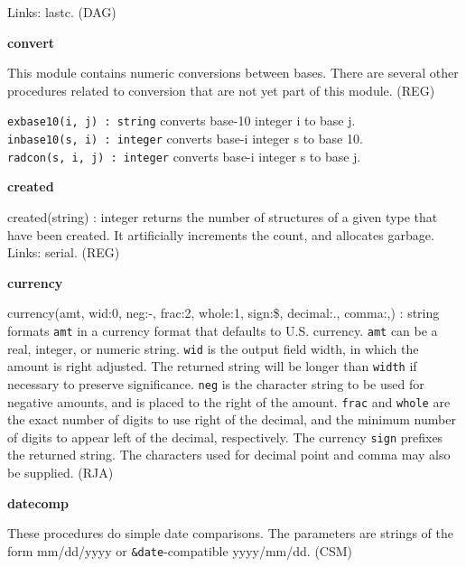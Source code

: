 
Links: lastc. (DAG)

{\sffamily\bfseries
convert}

This module contains numeric conversions between
bases. There are several other procedures related
to conversion that are not yet part of this module. (REG)

\texttt{exbase10(i, j) : string} converts base-10 integer i to base
j.\\
\texttt{inbase10(s, i) : integer} converts base-i integer s to base
10.\\
\texttt{radcon(s, i, j) : integer} converts base-i integer s to base j.

{\sffamily\bfseries
created}

\textsf{created(string) : integer} returns the number of structures of a
given type that have been created. It artificially increments the
count, and allocates garbage. Links: \textsf{serial}. (REG)

{\sffamily\bfseries
currency}

\textsf{currency(amt, wid:0, neg:{\textquotedbl}-{\textquotedbl},
frac:2, whole:1, sign:{\textquotedbl}\${\textquotedbl},
decimal:{\textquotedbl}.{\textquotedbl},
comma:{\textquotedbl},{\textquotedbl}) : string} formats \texttt{amt}
in a currency format that defaults to U.S. currency. \texttt{amt} can
be a real, integer, or numeric string. \texttt{wid} is the output field
width, in which the amount is right adjusted. The returned string will
be longer than \texttt{width} if necessary to preserve significance.
\texttt{neg} is the character string to be used for negative amounts,
and is placed to the right of the amount. \texttt{frac} and
\texttt{whole} are the exact number of digits to use right of the
decimal, and the minimum number of digits to appear left of the
decimal, respectively. The currency \texttt{sign} prefixes the returned
string. The characters used for decimal point and comma may also be
supplied. (RJA)

{\sffamily\bfseries
datecomp}

These procedures do simple date comparisons. The
parameters are strings of the form mm/dd/yyyy or
\texttt{\&date}{}-compatible yyyy/mm/dd. (CSM)

